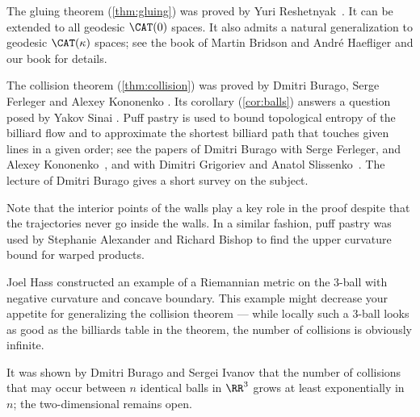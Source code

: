The gluing theorem (\ref{thm:gluing}) was proved by Yuri Reshetnyak~\cite{reshetnyak:glue}.
It can be extended to all geodesic $\CAT(0)$ spaces.
It also admits a natural generalization to 
geodesic $\CAT(\kappa)$
spaces;
see the book of Martin Bridson and  Andr\'e Haefliger \cite{bridson-haefliger} and our book \cite{alexander-kapovitch-petrunin-2025} for details.

The collision theorem (\ref{thm:collision}) was proved by Dmitri Burago, Serge Ferleger and Alexey Kononenko \cite{burago-ferleger-kononenko-1997}.
Its corollary (\ref{cor:balls}) answers a question posed by Yakov Sinai \cite{galperin}.
Puff pastry is used to bound topological entropy of the billiard flow 
and to approximate the shortest billiard path that  touches given lines in a given order; 
see the papers of Dmitri Burago with  Serge Ferleger,
and Alexey Kononenko~\cite{burago-ferleger-kononenko-1998}, and with
Dimitri Grigoriev and Anatol Slissenko~\cite{burago-grigoriev-slissenko}.
The lecture of Dmitri Burago \cite{burago-1998} gives a short survey on the subject.

Note that the interior points of the walls play a key role in the proof
despite that the trajectories never go inside the walls.
In a similar fashion, puff pastry was used by Stephanie Alexander and Richard Bishop \cite{alexander-bishop}
to find the upper curvature bound for warped products.

Joel Hass \cite{hass} constructed an example of a Riemannian metric on the 3-ball with negative curvature and concave boundary.
This example might decrease your appetite for generalizing the collision theorem --- while
locally such a 3-ball looks as good as the billiards table in the theorem, the number of collisions is obviously infinite.

It was shown by Dmitri Burago and Sergei Ivanov \cite{burago-ivanov} that the number of collisions that may occur between $n$ identical balls in $\RR^3$ grows at least exponentially in $n$; the two-dimensional remains open.

